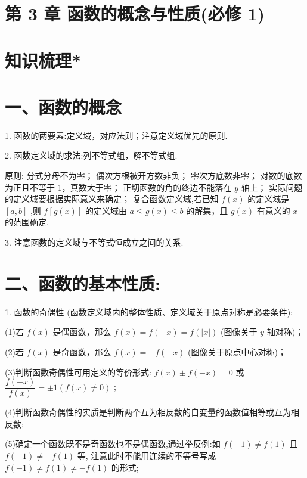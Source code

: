 \section*{第 3 章 函数的概念与性质(必修 1)}

\section*{知识梳理*}

\section*{一、函数的概念}

1. 函数的两要素:定义域，对应法则；注意定义域优先的原则.

2. 函数定义域的求法:列不等式组，解不等式组.

原则:   分式分母不为零；   偶次方根被开方数非负；   零次方底数非零；   对数的底数为正且不等于 1，真数大于零；  正切函数的角的终边不能落在 $y$ 轴上；  实际问题的定义域要根据实际意义来确定；  复合函数定义域,若已知 $f\left( x\right)$ 的定义域是 $\left\lbrack  {a,b}\right\rbrack$ ,则 $f\left\lbrack  {g\left( x\right) }\right\rbrack$ 的定义域由 $a \leq  g\left( x\right)  \leq  b$ 的解集，且 $g\left( x\right)$ 有意义的 $x$ 的范围确定.

3. 注意函数的定义域与不等式恒成立之间的关系.

\section*{二、函数的基本性质:}

1. 函数的奇偶性 (函数定义域内的整体性质、定义域关于原点对称是必要条件):

(1)若 $f\left( x\right)$ 是偶函数，那么 $f\left( x\right)  = f\left( {-x}\right)  = f\left( \left| x\right| \right)$ (图像关于 $y$ 轴对称)；

(2)若 $f\left( x\right)$ 是奇函数，那么 $f\left( x\right)  =  - f\left( {-x}\right)$ (图像关于原点中心对称)；

(3)判断函数奇偶性可用定义的等价形式: $f\left( x\right)  \pm  f\left( {-x}\right)  = 0$ 或 $\dfrac{f\left( {-x}\right) }{f\left( x\right) } =  \pm  1\left( {f\left( x\right)  \neq  0}\right)$ ;

(4)判断函数奇偶性的实质是判断两个互为相反数的自变量的函数值相等或互为相反数;

(5)确定一个函数既不是奇函数也不是偶函数,通过举反例:如 $f\left( {-1}\right)  \neq  f\left( 1\right)$ 且 $f\left( {-1}\right)  \neq   - f\left( 1\right)$ 等, 注意此时不能用连续的不等号写成 $f\left( {-1}\right)  \neq  f\left( 1\right)  \neq   - f\left( 1\right)$ 的形式;

